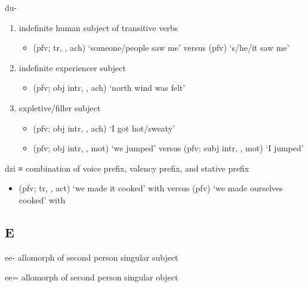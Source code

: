 \documentclass[12pt,letterpaper,oneside,article]{memoir}
\begin{document}
\begin{morphdesc}[resume*=alphalist]
\item[du-]
	\begin{enumerate}
	\item	indefinite human subject of transitive verbs
		\begin{itemize}
		\item	{} (pfv; tr, , ach) ‘someone/people saw me’\newline
			versus  (pfv) ‘s/he/it saw me’
		\end{itemize}
	\item	indefinite experiencer subject
		\begin{itemize}
		\item	{} (pfv; obj intr, , ach) ‘north wind was felt’
		\end{itemize}
	\item	expletive/filler subject
		\begin{itemize}
		\item	{} (pfv; obj intr, , ach) ‘I got hot/sweaty’
		\item	{} (pfv; obj intr, , mot) ‘we jumped’\newline
			versus  (pfv; subj intr, , mot) ‘I jumped’
		\end{itemize}
	\end{enumerate}

\item[dzi]
	≡ 
	combination of  voice prefix,
		 valency prefix,
		and  stative prefix
	\begin{itemize}
	\item	{} (pfv; tr, ,  act) ‘we made it cooked’ with \newline
		versus  (pfv) ‘we made ourselves cooked’ with 
	\end{itemize}
\end{morphdesc}

\subsection{E}\label{sec:alphalist-e}
\begin{morphdesc}[resume*=alphalist]
\item[ee-]
	allomorph of  second person singular subject

\item[ee=]
	allomorph of  second person singular object
\end{morphdesc}
\end{document}
